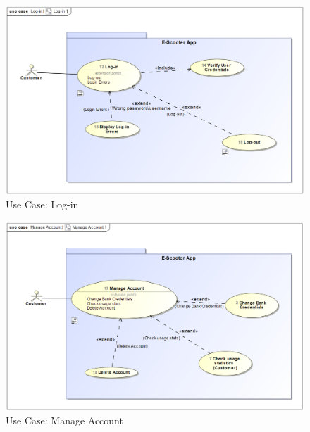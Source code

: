 \documentclass[a4paper, 12pt]{article}
\begin{document}
\begin{figure} [htbp]
  \begin{center}
    \includegraphics[scale=0.6]{images/UseCases/Log-in.png}
  \end{center}
  \caption{Use Case: Log-in}
\end{figure}

\begin{figure} [htbp]
  \begin{center}
    \includegraphics[scale=0.6]{images/UseCases/ManageAccount.png}
  \end{center}
  \caption{Use Case: Manage Account}
\end{figure}
\end{document}
